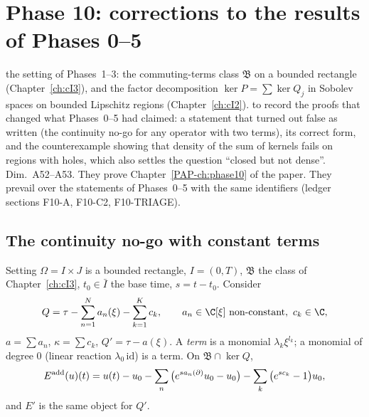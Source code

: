 \chapter[Phase 10 corrections]{Phase 10: corrections to the results of Phases 0--5}\label{ch:cIII6}
\chapterbrief
{the setting of Phases~1--3: the commuting-terms class $\mathfrak B$ on a bounded rectangle (Chapter~\ref{ch:cI3}), and the factor decomposition $\ker P=\sum\ker Q_j$ in Sobolev spaces on bounded Lipschitz regions (Chapter~\ref{ch:cI2}).}
{to record the proofs that changed what Phases~0--5 had claimed: a statement that turned out false as written (the continuity no-go for any operator with two terms), its correct form, and the counterexample showing that density of the sum of kernels fails on regions with holes, which also settles the question ``closed but not dense''.}
{Dim.~A52--A53. They prove Chapter~\ref{PAP-ch:phase10} of the paper. They prevail over the statements of Phases~0--5 with the same identifiers (ledger sections F10-A, F10-C2, F10-TRIAGE).}

\section{The continuity no-go with constant terms}

\begin{notebox}{Setting}
$\Omega=I\times J$ is a bounded rectangle, $I=(0,T)$, $\mathfrak B$ the class of Chapter~\ref{ch:cI3}, $t_0\in\bar I$ the base time, $s=t-t_0$. Consider
\[
Q=\tau-\sum_{n=1}^Na_n(\xi)-\sum_{k=1}^Kc_k,\qquad a_n\in\C[\xi]\ \text{non-constant},\ c_k\in\C,
\]
$a=\sum a_n$, $\kappa=\sum c_k$, $Q'=\tau-a(\xi)$. A \emph{term} is a monomial $\lambda_k\xi^{l_k}$; a monomial of degree $0$ (linear reaction $\lambda_0\,\mathrm{id}$) is a term. On $\mathfrak B\cap\ker Q$,
\[
E^{\rm add}(u)(t)=u(t)-u_0-\sum_n\big(e^{sa_n(\partial)}u_0-u_0\big)-\sum_k\big(e^{sc_k}-1\big)u_0,
\]
and $E'$ is the same object for $Q'$.
\end{notebox}

